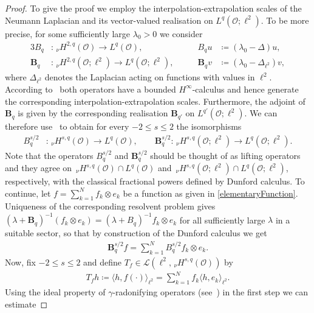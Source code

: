 \documentclass[reqno]{amsart}
\newcommand{\sL}{\mathscr{L}}
\newcommand{\sO}{\mathscr{O}}
\newcommand{\1}{\mathbf{1}}
\newcommand{\nH}{\ensuremath{\,_\nu H}}
\newcommand{\bpsn}[1]{\ensuremath{\nH^{#1}(\sO)}}
\begin{document}
\begin{proof}
To give the proof we employ the interpolation-extrapolation scales of the Neumann Laplacian and its vector-valued realisation on $L^q(\sO;\ell^2)$. To be more precise, for some sufficiently large $\lambda_0>0$ we consider
\begin{alignat*}{3}
    B_q &\colon \nH^{2,q}(\sO) \to L^q(\sO),
    \qquad &B_q u &\coloneqq (\lambda_0-\Delta)u,
    \\
    \mathbf{B}_q &\colon \nH^{2,q}(\sO;\ell^2) \to L^q(\sO;\ell^2),
    \qquad &\mathbf{B}_q v &\coloneqq (\lambda_0-\Delta_{\ell^2})v,
\end{alignat*}
where $\Delta_{\ell^2}$ denotes the Laplacian acting on functions with values in $\ell^2$. According to~\cite[Theorem~2.3]{denkNewThoughtsOld2004} both operators have a bounded $H^\infty$-calculus and hence generate the corresponding interpolation-extrapolation scales.
Furthermore, the adjoint of $\mathbf B_q$ is given by the corresponding
realisation $\mathbf B_{q'}$ on $L^{q'}(\sO;\ell^2)$. We can therefore use~\cite[Theorem~1.5.4]{amannLinearQuasilinearParabolic1995} to obtain for every $-2\leq s \leq 2 $ the isomorphisms
\begin{align*}
    B^{s/2}_{q}
    &\colon \nH^{s,q}(\sO)
    \to L^q(\sO),
    \qquad
    \mathbf{B}_q^{s/2}
    \colon \nH^{s,q}(\sO;\ell^2)
    \to L^q(\sO;\ell^2).
\end{align*}
Note that the operators $B^{s/2}_q$ and $\mathbf{B}_q^{s/2}$ should be thought of as lifting operators and they agree on $\nH^{s,q}(\sO)\cap L^q(\sO)$ and $\nH^{s,q}(\sO;\ell^2)\cap L^q(\sO;\ell^2)$, respectively, with the classical fractional powers defined by Dunford calculus.
To continue, let $f= \sum_{k=1}^N f_k\otimes e_k$ be a function as given in \eqref{elementaryFunction}. Uniqueness of the corresponding
resolvent problem gives
 $(\lambda+\mathbf B_q)^{-1}(f_k\otimes e_k)
    =(\lambda+B_q)^{-1}f_k\otimes e_k$
for all sufficiently large $\lambda$ in a suitable sector, so that by construction of the Dunford calculus we get
\begin{align*}
    \mathbf{B}_q^{s/2} f= \sum_{k=1}^N B_q^{s/2} f_k\otimes e_k.
\end{align*}
Now, fix $-2\leq s \leq 2$ and define $T_f\in\sL(\ell^2,\bpsn{s,q})$ by
\begin{align*}
    T_fh
    \coloneqq
    \langle h,f(\cdot)\rangle_{\ell^2}
    =
    \sum_{k=1}^N
    f_k\langle h,e_k\rangle_{\ell^2}.
\end{align*}
Using the ideal property of $\gamma$-radonifying operators (see~\cite[Theorem~9.1.10]{hytonenAnalysisBanachSpaces2017}) in the first step we can estimate

\end{proof}
\end{document}
